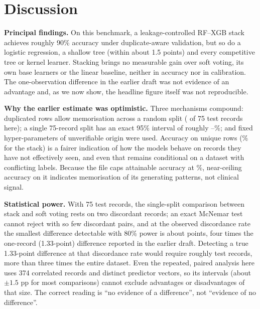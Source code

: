 \documentclass[11pt,a4paper]{article}
\begin{document}
\begin{table}[t]\centering\small
\caption{Audited local explanations (original-split test records). Person ID is the dataset identifier; $R^2$ is LIME's weighted-surrogate fidelity (mean of 10 seeds); rank $\rho$ is the mean pairwise Spearman correlation of absolute weights across seeds; top-3 features by mean weight in the encoded space.}\label{tab:lime}
\resizebox{\textwidth}{!}{}
\end{table}

\section{Discussion}
\textbf{Principal findings.} On this benchmark, a leakage-controlled RF--XGB stack achieves roughly 90\% accuracy under duplicate-aware validation, but so do a logistic regression, a shallow tree (within about 1.5 points) and every competitive tree or kernel learner. Stacking brings no measurable gain over soft voting, its own base learners or the linear baseline, neither in accuracy nor in calibration. The one-observation difference in the earlier draft was not evidence of an advantage and, as we now show, the headline figure itself was not reproducible.

\textbf{Why the earlier estimate was optimistic.} Three mechanisms compound: duplicated rows allow memorisation across a random split (\OrigLeak{} of 75 test records here); a single 75-record split has an exact 95\% interval of roughly \OrigStackCPlo--\OrigStackCPhi\%; and fixed hyper-parameters of unverifiable origin were used. Accuracy on unique rows (\AccStackD\% for the stack) is a fairer indication of how the models behave on records they have not effectively seen, and even that remains conditional on a dataset with conflicting labels. Because the file caps attainable accuracy at \Ceiling\%, near-ceiling accuracy on it indicates memorisation of its generating patterns, not clinical signal.

\textbf{Statistical power.} With 75 test records, the single-split comparison between stack and soft voting rests on two discordant records; an exact McNemar test cannot reject with so few discordant pairs, and at the observed discordance rate the smallest difference detectable with 80\% power is about \OrigMDE{} points, four times the one-record (1.33-point) difference reported in the earlier draft. Detecting a true 1.33-point difference at that discordance rate would require roughly \NReq{} test records, more than three times the entire dataset. Even the repeated, paired analysis here uses 374 correlated records and \NVec{} distinct predictor vectors, so its intervals (about $\pm1.5$ pp for most comparisons) cannot exclude advantages or disadvantages of that size. The correct reading is ``no evidence of a difference'', not ``evidence of no difference''.
\end{document}
